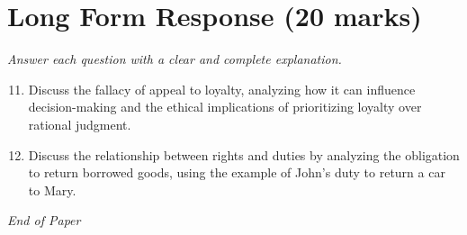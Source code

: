 \documentclass[12pt]{article}
\begin{document}
\section*{Long Form Response (20 marks)}
\textit{Answer each question with a clear and complete explanation.}
\begin{enumerate}[label=\arabic*.]
\setcounter{enumi}{10}
\item Discuss the fallacy of appeal to loyalty, analyzing how it can influence decision-making and the ethical implications of prioritizing loyalty over rational judgment.
\item Discuss the relationship between rights and duties by analyzing the obligation to return borrowed goods, using the example of John's duty to return a car to Mary.
\end{enumerate}

\vfill
\noindent\textit{End of Paper}
\end{document}
